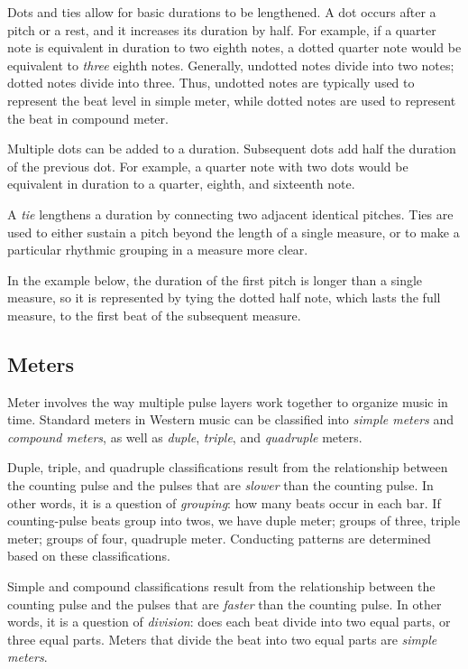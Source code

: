 \documentclass{book}
\begin{document}
Dots and ties allow for basic durations to be lengthened. A dot occurs after a
pitch or a rest, and it increases its duration by half. For example, if a
quarter note is equivalent in duration to two eighth notes, a dotted quarter
note would be equivalent to \emph{three} eighth notes. Generally, undotted
notes divide into two notes; dotted notes divide into three. Thus, undotted
notes are typically used to represent the beat level in simple meter, while
dotted notes are used to represent the beat in compound meter.

Multiple dots can be added to a duration. Subsequent dots add half the
duration of the previous dot. For example, a quarter note with two dots would
be equivalent in duration to a quarter, eighth, and sixteenth note.

A \emph{tie} lengthens a duration by connecting two adjacent identical
pitches. Ties are used to either sustain a pitch beyond the length of a single
measure, or to make a particular rhythmic grouping in a measure more clear.

In the example below, the duration of the first pitch is longer than a single
measure, so it is represented by tying the dotted half note, which lasts the
full measure, to the first beat of the subsequent measure.

\hypertarget{meters}{%
\subsection{Meters}\label{meters}}

Meter involves the way multiple pulse layers work together to organize music
in time. Standard meters in Western music can be classified into \emph{simple
meters} and \emph{compound meters}, as well as \emph{duple}, \emph{triple},
and \emph{quadruple} meters.

Duple, triple, and quadruple classifications result from the relationship
between the counting pulse and the pulses that are \emph{slower} than the
counting pulse. In other words, it is a question of \emph{grouping}: how many
beats occur in each bar. If counting-pulse beats group into twos, we have
duple meter; groups of three, triple meter; groups of four, quadruple meter.
Conducting patterns are determined based on these classifications.

Simple and compound classifications result from the relationship between the
counting pulse and the pulses that are \emph{faster} than the counting pulse.
In other words, it is a question of \emph{division}: does each beat divide
into two equal parts, or three equal parts. Meters that divide the beat into
two equal parts are \emph{simple meters}.
\end{document}
